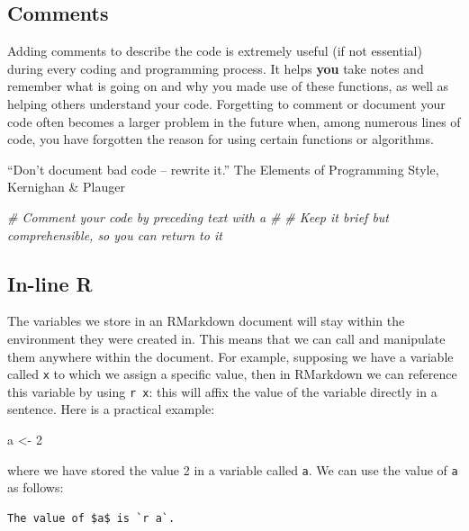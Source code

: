 \documentclass[12pt,]{krantz}
\newenvironment{Shaded}{\begin{snugshade}}{\end{snugshade}}
\newcommand{\DecValTok}[1]{\textcolor[rgb]{0.06,0.06,0.06}{#1}}
\newcommand{\StringTok}[1]{\textcolor[rgb]{0.5,0.5,0.5}{#1}}
\newcommand{\CommentTok}[1]{\textcolor[rgb]{0.37,0.37,0.37}{\textit{#1}}}
\newcommand{\NormalTok}[1]{#1}
\renewenvironment{quote}{\begin{VF}}{\end{VF}}
\begin{document}
\subsection{Comments}\label{comments}

Adding comments to describe the code is extremely useful (if not
essential) during every coding and programming process. It helps
\textbf{you} take notes and remember what is going on and why you made
use of these functions, as well as helping others understand your code.
Forgetting to comment or document your code often becomes a larger
problem in the future when, among numerous lines of code, you have
forgotten the reason for using certain functions or algorithms.

\begin{quote}
``Don't document bad code -- rewrite it.'' The Elements of Programming
Style, Kernighan \& Plauger
\end{quote}

\begin{Shaded}
\begin{Highlighting}[]
\CommentTok{# Comment your code by preceding text with a # }
\CommentTok{# Keep it brief but comprehensible, so you can return to it }
\end{Highlighting}
\end{Shaded}

\subsection{In-line R}\label{in-line-r}

The variables we store in an RMarkdown document will stay within the
environment they were created in. This means that we can call and
manipulate them anywhere within the document. For example, supposing we
have a variable called \texttt{x} to which we assign a specific value,
then in RMarkdown we can reference this variable by using \texttt{r\ x}:
this will affix the value of the variable directly in a sentence. Here
is a practical example:

\begin{Shaded}
\begin{Highlighting}[]
\NormalTok{a <-}\StringTok{ }\DecValTok{2}
\end{Highlighting}
\end{Shaded}

where we have stored the value 2 in a variable called \texttt{a}. We can
use the value of \texttt{a} as follows:

\begin{verbatim}
The value of $a$ is `r a`. 
\end{verbatim}
\end{document}
